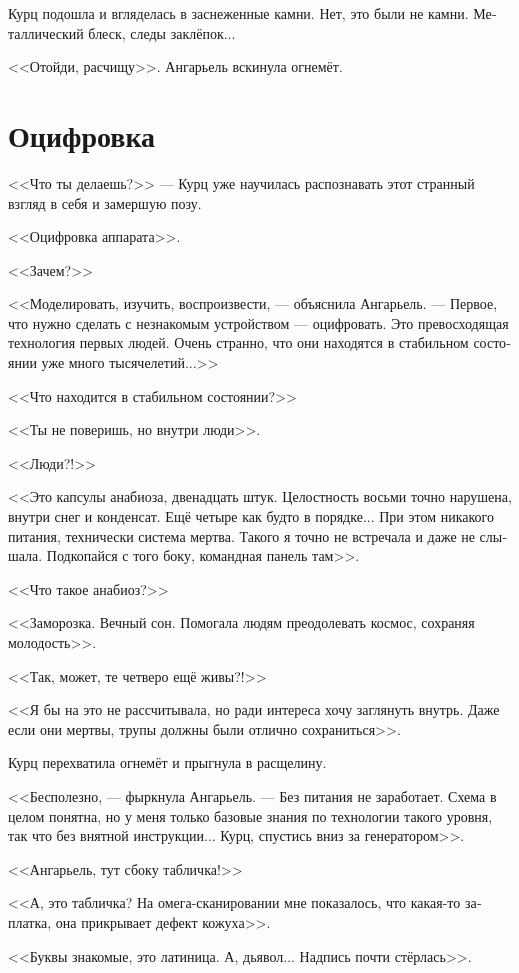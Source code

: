 \documentclass[a4paper,12pt,fleqn]{book}\usepackage{cooltooltips}\usepackage{polyglossia}\setdefaultlanguage[babelshorthands=true]{russian}\setotherlanguage{english}\defaultfontfeatures{Ligatures=TeX,Mapping=tex-text} \usepackage{xcolor}\definecolor{lightgray}{HTML}{bbbbbb}\color{lightgray}\newcommand{\ml}[3]{\textenglish{\textcolor{black}{#3}}}
\begin{document}
Курц подошла и вгляделась в заснеженные камни.
Нет, это были не камни.
Металлический блеск, следы заклёпок...

<<Отойди, расчищу>>.
Ангарьель вскинула огнемёт.

\section{Оцифровка}

<<Что ты делаешь?>> --- Курц уже научилась распознавать этот странный взгляд в себя и замершую позу.

<<Оцифровка аппарата>>.

<<Зачем?>>

<<Моделировать, изучить, воспроизвести, --- объяснила Ангарьель.
--- Первое, что нужно сделать с незнакомым устройством --- оцифровать.
Это превосходящая технология первых людей.
Очень странно, что они находятся в стабильном состоянии уже много тысячелетий...>>

<<Что находится в стабильном состоянии?>>

<<Ты не поверишь, но внутри люди>>.

<<Люди?!>>

<<Это капсулы анабиоза, двенадцать штук.
Целостность восьми точно нарушена, внутри снег и конденсат.
Ещё четыре как будто в порядке...
При этом никакого питания, технически система мертва.
Такого я точно не встречала и даже не слышала.
Подкопайся с того боку, командная панель там>>.

<<Что такое анабиоз?>>

<<Заморозка.
Вечный сон.
Помогала людям преодолевать космос, сохраняя молодость>>.

<<Так, может, те четверо ещё живы?!>>

<<Я бы на это не рассчитывала, но ради интереса хочу заглянуть внутрь.
Даже если они мертвы, трупы должны были отлично сохраниться>>.

Курц перехватила огнемёт и прыгнула в расщелину.

<<Бесполезно, --- фыркнула Ангарьель.
--- Без питания не заработает.
Схема в целом понятна, но у меня только базовые знания по технологии такого уровня, так что без внятной инструкции...
Курц, спустись вниз за генератором>>.

<<Ангарьель, тут сбоку табличка!>>

<<А, это табличка?
На омега-сканировании мне показалось, что какая-то заплатка, она прикрывает дефект кожуха>>.

<<Буквы знакомые, это латиница.
А, дьявол...
Надпись почти стёрлась>>.
\end{document}
